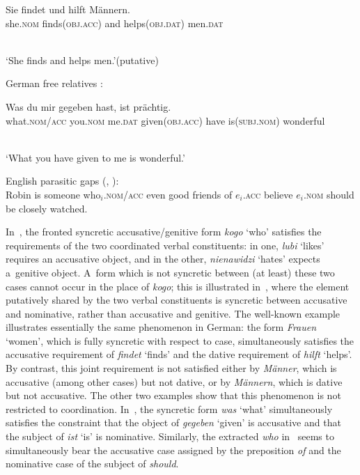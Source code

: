 \documentclass[output=paper]{langsci/langscibook}
\begin{document}
\begin{examples}
\begin{examples}
\begin{gloss}
      \prep{*}Sie findet und hilft Männern. \\
      she.\textsc{nom} finds(\textsc{obj.acc}) and helps(\textsc{obj.dat}) men.\textsc{dat}
    \end{gloss}\\[\glosslen]
    ‘She finds and helps men.’\hfill(putative)
  \end{examples}
\item\label{ex:syn:gfr} German free relatives \citep[212]{GR81}: \\ [1ex]
  \begin{gloss}
    Was du mir gegeben hast, ist prächtig. \\
    what.\textsc{nom/acc} you.\textsc{nom} me.\textsc{dat} given(\textsc{obj.acc}) have is(\textsc{subj.nom}) wonderful
  \end{gloss} \\[\glosslen]
  ‘What you have given to me is wonderful.’
\item\label{ex:syn:epg} English parasitic gaps (\citealt[482]{HL96a}, \citealt[205]{LHC2001a-u}): \\ [1ex]
  Robin is someone who$_i$.\textsc{nom/acc} even good friends of $e_i$.\textsc{acc} believe $e_i$.\textsc{nom} should be closely watched.
\end{examples}
In~, the fronted syncretic accusative/genitive form \emph{kogo} ‘who’ satisfies the requirements of the two coordinated verbal constituents: in one, \emph{lubi} ‘likes’ requires an accusative object, and in the other, \emph{nienawidzi} ‘hates’ expects a~genitive object.  A~form which is not syncretic between (at least) these two cases cannot occur in the place of \emph{kogo}; this is illustrated in~, where the element putatively shared by the two verbal constituents is syncretic between accusative and nominative, rather than accusative and genitive.  The well-known example~ illustrates essentially the same phenomenon in German: the form \emph{Frauen} ‘women’, which is fully syncretic with respect to case, simultaneously satisfies the accusative requirement of \emph{findet} ‘finds’ and the dative requirement of \emph{hilft} ‘helps’.  By contrast, this joint requirement is not satisfied either by \emph{Männer}, which is accusative (among other cases) but not dative, or by \emph{Männern}, which is dative but not accusative.  The other two examples show that this phenomenon is not restricted to coordination.  In~, the syncretic form \emph{was} ‘what’ simultaneously satisfies the constraint that the object of \emph{gegeben} ‘given’ is accusative and that the subject of \emph{ist} ‘is’ is nominative.  Similarly, the extracted \emph{who} in~ seems to simultaneously bear the accusative case assigned by the preposition \emph{of} and the nominative case of the subject of \emph{should}.
\end{document}
